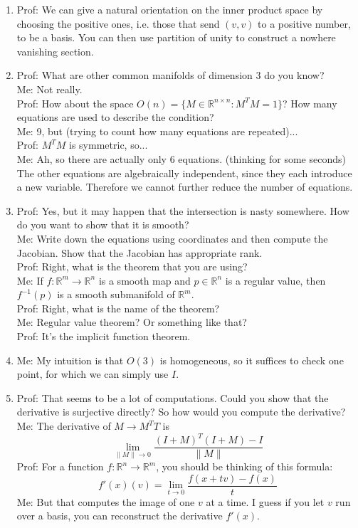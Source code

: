 \documentclass[12pt]{article}
\theoremstyle{plain}
\theoremstyle{definition}
\newcommand{\IR}{\mathbb{R}}
\newcommand{\<}{\langle}
\renewcommand{\>}{\rangle}
\begin{document}
\begin{enumerate}
\item Prof: We can give a natural orientation on the inner product space by choosing the positive ones, i.e. those that send $(v, v)$ to a positive number, to be a basis. You can then use partition of unity to construct a nowhere vanishing section. 

\item Prof: What are other common manifolds of dimension $3$ do you know? \\
Me: Not really. \\
Prof: How about the space $O(n) = \{ M \in \IR^{n \times n} : M^T M = 1 \}$? How many equations are used to describe the condition? \\
Me: 9, but (trying to count how many equations are repeated)...\\
Prof: $M^T M$ is symmetric, so...\\
Me: Ah, so there are actually only $6$ equations. (thinking for some seconds) The other equations are algebraically independent, since they each introduce a new variable. Therefore we cannot further reduce the number of equations. 

\item Prof: Yes, but it may happen that the intersection is nasty somewhere. How do you want to show that it is smooth? \\
Me: Write down the equations using coordinates and then compute the Jacobian. Show that the Jacobian has appropriate rank. \\
Prof: Right, what is the theorem that you are using? \\
Me: If $f : \IR^m \to \IR^n$ is a smooth map and $p \in \IR^n$ is a regular value, then $f^{-1}(p)$ is a smooth submanifold of $\IR^m$. \\
Prof: Right, what is the name of the theorem?\\
Me: Regular value theorem? Or something like that? \\
Prof: It's the implicit function theorem. 

\item Me: My intuition is that $O(3)$ is homogeneous, so it suffices to check one point, for which we can simply use $I$. 

\item Prof: That seems to be a lot of computations. Could you show that the derivative is surjective directly? So how would you compute the derivative? \\
Me: The derivative of $M \to M^T T$ is 
$$ \lim_{\| M \| \to 0} \frac{(I + M)^T(I + M) - I}{\| M \|} $$
Prof: For a function $f : \IR^n \to \IR^m$, you should be thinking of this formula:
$$ f'(x)(v) = \lim_{t \to 0} \frac{f(x + tv) - f(x)}{t} $$ 
Me: But that computes the image of one $v$ at a time. I guess if you let $v$ run over a basis, you can reconstruct the derivative $f'(x)$. \\


\end{enumerate}
\end{document}
